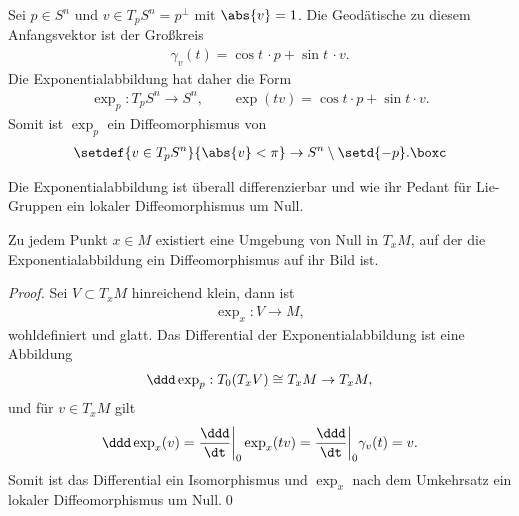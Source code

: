 \documentclass[%
	paper=a5,%
	fleqn,%
	DIV=18,%
	BCOR=0mm,
	fontsize=11pt,
	titlepage=false,%
	bibliography=totoc,
	DIV=18,%
	twoside=true,
	pdftitle=Riemannsche Geometrie,
	pdfauthor=Uwe Semmelmann,
	numbers=noendperiod]%
	{scrbook}
\begin{document}
\begin{ex}
Sei $p\in S^n$ und $v\in T_pS^n = p^\bot$ mit $\abs{v} = 1$. Die Geodätische zu diesem
Anfangsvektor ist der Großkreis
\begin{align*}
\gamma_v(t) = \cos t\,\cdot p+ \sin t\, \cdot v. 
\end{align*}
Die Exponentialabbildung hat daher die Form
\begin{align*}
\exp_p : T_pS^n \to S^n,\qquad \exp(tv) = \cos t\cdot p + \sin t\cdot v.
\end{align*}
Somit ist $\exp_p$ ein Diffeomorphismus von
\begin{align*}
\setdef{v\in T_pS^n}{\abs{v}< \pi} \to S^n\setminus\setd{-p}.\boxc
\end{align*}
\end{ex}

Die Exponentialabbildung ist überall differenzierbar und wie ihr Pedant für Lie-Gruppen ein lokaler Diffeomorphismus um Null.


\begin{prop}
Zu jedem Punkt $x\in M$ existiert eine Umgebung von Null in $T_xM$, auf
der die Exponentialabbildung ein Diffeomorphismus auf ihr Bild ist.\fish
\end{prop}
\begin{proof}
Sei $V\subset T_xM$ hinreichend klein, dann ist
\begin{align*}
\exp_x : V\to M,
\end{align*}
wohldefiniert und glatt. Das Differential der Exponentialabbildung ist eine
Abbildung
\begin{align*}
\ddd \exp_p: T_0(T_xV)\cong T_xM \to T_xM,
\end{align*}
und für $v\in T_xM$ gilt
\begin{align*}
\ddd \exp_x(v) = \frac{\ddd}{\dt}\bigg|_0 \exp_x(tv)
= \frac{\ddd}{\dt}\bigg|_0 \gamma_v(t)
= v.
\end{align*}
Somit ist das Differential ein Isomorphismus und $\exp_x$ nach dem Umkehrsatz
ein lokaler Diffeomorphismus um Null.\qed
\end{proof}
\end{document}
